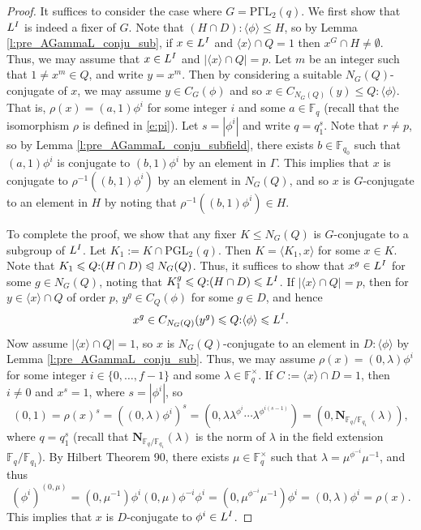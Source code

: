 \documentclass[twoside,a4paper,reqno,11pt]{amsart}
\newcommand{\normeq}{\trianglelefteqslant}
\newcommand{\<}{\langle}
\renewcommand{\>}{\rangle}
\newcommand{\la}{\langle}
\newcommand{\ra}{\rangle}
\newcommand{\leqs}{\leqslant}
\newcommand{\PGL}{\mathrm{PGL}}
\newcommand{\PGammaL}{\mathrm{P\Gamma L}}
\theoremstyle{definition}
\begin{document}
	\begin{proof}
		It suffices to consider the case where $G = \PGammaL_2(q)$.
		We first show that $L^{\rm I}$ is indeed a fixer of $G$. Note that $(H\cap D){:}\la\phi\ra\leqs H$, so by Lemma \ref{l:pre_AGammaL_conju_sub}, if $x\in L^{\rm I}$ and $\la x\ra \cap Q = 1$ then $x^G\cap H\ne\emptyset$. Thus, we may assume that $x\in L^{\rm I}$ and $|\la x\ra\cap Q| = p$. Let $m$ be an integer such that $1\ne x^m\in Q$, and write $y = x^m$. Then by considering a suitable $N_G(Q)$-conjugate of $x$, we may assume $y\in C_G(\phi)$ and so $x\in C_{N_G(Q)}(y) \leqs Q{:}\la\phi\ra$. That is, $\rho(x) = (a,1)\phi^i$ for some integer $i$ and some $a\in\mathbb{F}_q$ (recall that the isomorphism $\rho$ is defined in \eqref{e:pi}). Let $s = |\phi^i|$ and write $q = q_1^s$.
		Note that $r\ne p$, so by Lemma \ref{l:pre_AGammaL_conju_subfield}, there exists $b\in\mathbb{F}_{q_0}$ such that $(a,1)\phi^i$ is conjugate to $(b,1)\phi^i$ by an element in $\Gamma$. This implies that $x$ is conjugate to $\rho^{-1}((b,1)\phi^i)$ by an element in $N_G(Q)$, and so $x$ is $G$-conjugate to an element in $H$ by noting that $\rho^{-1}((b,1)\phi^i)\in H$.
		
		To complete the proof, we show that any fixer $K\leqs N_G(Q)$ is $G$-conjugate to a subgroup of $L^{\rm I}$. Let $K_1:=K\cap \PGL_2(q)$. Then $K = \la K_1,x\ra$ for some $x\in K$. Note that $K_1\leqs Q{:}(H\cap D)\normeq N_G(Q)$. Thus, it suffices to show that $x^g\in L^{\rm I}$ for some $g\in N_G(Q)$, noting that $K_1^g\leqs Q{:}(H\cap D)\leqs L^{\rm I}$. If $|\la x\ra\cap Q| = p$, then for $y\in\la x\ra\cap Q$ of order $p$, $y^g\in C_Q(\phi)$ for some $g\in D$, and hence
		\begin{equation*}
		x^g\in C_{N_G(Q)}(y^g) \leqs Q{:}\la\phi\ra \leqs L^{\rm I}.
		\end{equation*}
		Now assume $|\la x\ra\cap Q| = 1$, so $x$ is $N_G(Q)$-conjugate to an element in $D{:}\la\phi\ra$ by Lemma \ref{l:pre_AGammaL_conju_sub}. Thus, we may assume $\rho(x) = (0,\lambda)\phi^i$ for some integer $i\in\{0,\dots,f-1\}$ and some $\lambda\in\mathbb{F}_q^\times$. If $C:=\la x\ra\cap D = 1$, then $i\ne 0$ and $x^s = 1$, where $s = |\phi^i|$, so
		\begin{equation*}
		(0,1) = \rho(x)^s = ((0,\lambda)\phi^i)^s = (0,\lambda\lambda^{\phi^i}\cdots\lambda^{\phi^{i(s-1)}}) = (0,\mathbf{N}_{\mathbb{F}_q/\mathbb{F}_{q_1}}(\lambda)),
		\end{equation*}
		where $q = q_1^s$ (recall that $\mathbf{N}_{\mathbb{F}_q/\mathbb{F}_{q_1}}(\lambda)$ is the norm of $\lambda$ in the field extension $\mathbb{F}_q/\mathbb{F}_{q_1}$). By Hilbert Theorem 90, there exists $\mu\in\mathbb{F}_q^\times$ such that $\lambda = \mu^{\phi^{-i}}\mu^{-1}$, and thus
		\begin{equation*}
		(\phi^i)^{(0,\mu)} = (0,\mu^{-1})\phi^i(0,\mu)\phi^{-i}\phi^i = (0,\mu^{\phi^{-i}}\mu^{-1})\phi^i = (0,\lambda)\phi^i = \rho(x).
		\end{equation*}
		This implies that $x$ is $D$-conjugate to $\phi^i\in L^{\rm I}$.
		

\end{proof}
\end{document}
